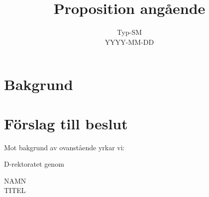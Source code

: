 \documentclass[a4paper]{article}
\title{Proposition angående }
\date{Typ-SM \\ YYYY-MM-DD} %
\begin{document}
\maketitle

\pagestyle{empty}
\thispagestyle{empty}

\section*{Bakgrund}


\section*{Förslag till beslut}
Mot bakgrund av ovanstående yrkar vi: %

\begin{list}{\bf att}
\item %
\end{list}


\vspace{2cm}
\noindent D-rektoratet genom %

\vspace{2cm}
\noindent NAMN \\ TITEL %
\end{document}
